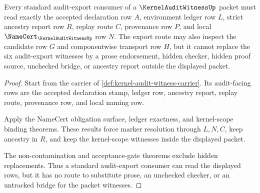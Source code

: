 \begin{theorem}
\label{thm:kernelauditwitness-bridge-boundary}
Every standard audit-export consumer of a $\KernelAuditWitnessUp$ packet must read exactly the accepted declaration row $A$, environment ledger row $L$, strict ancestry report row $R$, replay route $C$, provenance row $P$, and local $\NameCert_{\KernelAuditWitnessUp}$ row $N$. The export route may also inspect the candidate row $G$ and componentwise transport row $H$, but it cannot replace the six audit-export witnesses by a prose endorsement, hidden checker, hidden proof source, unchecked bridge, or ancestry report outside the displayed packet.
\end{theorem}
\begin{proof}
Start from the carrier of \autoref{def:kernel-audit-witness-carrier}. Its audit-facing rows are the accepted declaration stamp, ledger row, ancestry report, replay route, provenance row, and local naming row.

Apply the NameCert obligation surface, ledger exactness, and kernel-scope binding theorems. These results force marker resolution through $L,N,C$, keep ancestry in $R$, and keep the kernel-scope witnesses inside the displayed packet.

The non-contamination and acceptance-gate theorems exclude hidden replacements. Thus a standard audit-export consumer can read the displayed rows, but it has no route to substitute prose, an unchecked checker, or an untracked bridge for the packet witnesses.
\end{proof}


\begin{closurestatus}{\KernelAuditWitnessUp}
  \theoryclosure{\matureClosure}
  \formalstatus{\unformalizedV}
\end{closurestatus}
